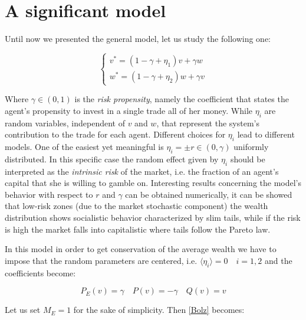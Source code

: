 \documentclass[12pt,a4paper]{article}
\numberwithin{theorem}{section}
\numberwithin{definition}{section}
\numberwithin{example}{section}
\numberwithin{exercise}{section}
\begin{document}


\section*{A significant model}


Until now we presented the general model, let us study the following one:

\begin{equation}\label{Model}
\begin{cases}
v^{*}=\left(1-\gamma+\eta_1\right)v+\gamma w \\
w^{*}=\left(1-\gamma+\eta_2\right)w+\gamma v
\end{cases}
\end{equation}

Where $\gamma\in(0,1)$ is the \textit{risk propensity}, namely the coefficient that states the agent's propensity to invest in a single trade all of her money. While $\eta_i$ are random variables, independent of $v$ and $w$, that represent the system's contribution to the trade for each agent. Different choices for $\eta_i$ lead to different models. One of the easiest yet meaningful is $\eta_i=\pm r\in(0,\gamma)$ uniformly distributed. In this specific case the random effect given by $\eta_i$ should be interpreted as the \textit{intrinsic risk} of the market, i.e. the fraction of an agent's capital that she is willing to gamble on. Interesting results concerning the model's behavior with respect to $r$ and $\gamma$ can be obtained numerically, it can be showed that low-risk zones (due to the market stochastic component) the wealth distribution shows socialistic behavior characterized by slim tails, while if the risk is high the market falls into capitalistic where tails follow the Pareto law.

In this model in order to get conservation of the average wealth we have to impose that the random parameters are centered, i.e. $\langle\eta_i\rangle=0\quad i=1,2$ and the coefficients become:

\[P_E(v) = \gamma \quad P(v) = -\gamma \quad Q(v) = v\]

Let us set $M_E=1$ for the sake of simplicity. Then \ref{Bolz} becomes:
\end{document}
